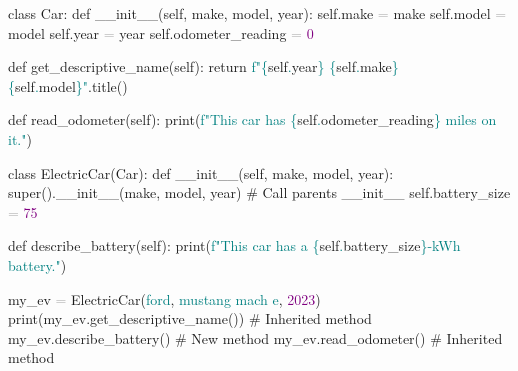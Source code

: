 \documentclass[
  justified,
  openright,
]{tufte-book}
\newcommand{\BuiltInTok}[1]{#1}
\newcommand{\CommentTok}[1]{\textcolor{MidGray}{#1}}
\newcommand{\ControlFlowTok}[1]{\textcolor{BrandBlue}{#1}}
\newcommand{\DecValTok}[1]{\textcolor{Purple}{#1}}
\newcommand{\FunctionTok}[1]{\textcolor{BrandBlue}{#1}}
\newcommand{\KeywordTok}[1]{\textcolor{BrandBlue}{#1}}
\newcommand{\NormalTok}[1]{#1}
\newcommand{\OperatorTok}[1]{\textcolor{DarkGray}{#1}}
\newcommand{\SpecialCharTok}[1]{\textcolor{Teal}{#1}}
\newcommand{\SpecialStringTok}[1]{\textcolor{Teal}{#1}}
\newcommand{\StringTok}[1]{\textcolor{Teal}{#1}}
\newcommand{\VariableTok}[1]{#1}
\newenvironment{Shaded}{%
  \begin{snugshade}
}{%
  \end{snugshade}
}
\begin{document}
\begin{Shaded}
\begin{Highlighting}[]
\KeywordTok{class}\NormalTok{ Car:}
    \KeywordTok{def} \FunctionTok{\_\_init\_\_}\NormalTok{(}\VariableTok{self}\NormalTok{, make, model, year):}
        \VariableTok{self}\NormalTok{.make }\OperatorTok{=}\NormalTok{ make}
        \VariableTok{self}\NormalTok{.model }\OperatorTok{=}\NormalTok{ model}
        \VariableTok{self}\NormalTok{.year }\OperatorTok{=}\NormalTok{ year}
        \VariableTok{self}\NormalTok{.odometer\_reading }\OperatorTok{=} \DecValTok{0}

    \KeywordTok{def}\NormalTok{ get\_descriptive\_name(}\VariableTok{self}\NormalTok{):}
        \ControlFlowTok{return} \SpecialStringTok{f"}\SpecialCharTok{\{}\VariableTok{self}\SpecialCharTok{.}\NormalTok{year}\SpecialCharTok{\}}\SpecialStringTok{ }\SpecialCharTok{\{}\VariableTok{self}\SpecialCharTok{.}\NormalTok{make}\SpecialCharTok{\}}\SpecialStringTok{ }\SpecialCharTok{\{}\VariableTok{self}\SpecialCharTok{.}\NormalTok{model}\SpecialCharTok{\}}\SpecialStringTok{"}\NormalTok{.title()}

    \KeywordTok{def}\NormalTok{ read\_odometer(}\VariableTok{self}\NormalTok{):}
        \BuiltInTok{print}\NormalTok{(}\SpecialStringTok{f"This car has }\SpecialCharTok{\{}\VariableTok{self}\SpecialCharTok{.}\NormalTok{odometer\_reading}\SpecialCharTok{\}}\SpecialStringTok{ miles on it."}\NormalTok{)}


\KeywordTok{class}\NormalTok{ ElectricCar(Car):}
    \KeywordTok{def} \FunctionTok{\_\_init\_\_}\NormalTok{(}\VariableTok{self}\NormalTok{, make, model, year):}
        \BuiltInTok{super}\NormalTok{().}\FunctionTok{\_\_init\_\_}\NormalTok{(make, model, year)   }\CommentTok{\# Call parent\textquotesingle{}s \_\_init\_\_}
        \VariableTok{self}\NormalTok{.battery\_size }\OperatorTok{=} \DecValTok{75}

    \KeywordTok{def}\NormalTok{ describe\_battery(}\VariableTok{self}\NormalTok{):}
        \BuiltInTok{print}\NormalTok{(}\SpecialStringTok{f"This car has a }\SpecialCharTok{\{}\VariableTok{self}\SpecialCharTok{.}\NormalTok{battery\_size}\SpecialCharTok{\}}\SpecialStringTok{{-}kWh battery."}\NormalTok{)}


\NormalTok{my\_ev }\OperatorTok{=}\NormalTok{ ElectricCar(}\StringTok{\textquotesingle{}ford\textquotesingle{}}\NormalTok{, }\StringTok{\textquotesingle{}mustang mach e\textquotesingle{}}\NormalTok{, }\DecValTok{2023}\NormalTok{)}
\BuiltInTok{print}\NormalTok{(my\_ev.get\_descriptive\_name())   }\CommentTok{\# Inherited method}
\NormalTok{my\_ev.describe\_battery()              }\CommentTok{\# New method}
\NormalTok{my\_ev.read\_odometer()                 }\CommentTok{\# Inherited method}
\end{Highlighting}
\end{Shaded}
\end{document}
